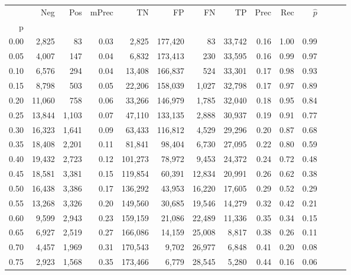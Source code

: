 \begin{tabular}{rrrrrrrrrrrrrr}
\toprule
{} &     Neg &    Pos & mPrec &       TN &       FP &      FN &      TP &  Prec &   Rec & $\hat{p}$ \\
p    &         &        &       &          &          &         &         &       &       &           \\
\midrule
0.00 &   2,825 &     83 &  0.03 &    2,825 &  177,420 &      83 &  33,742 &  0.16 &  1.00 &      0.99 \\
0.05 &   4,007 &    147 &  0.04 &    6,832 &  173,413 &     230 &  33,595 &  0.16 &  0.99 &      0.97 \\
0.10 &   6,576 &    294 &  0.04 &   13,408 &  166,837 &     524 &  33,301 &  0.17 &  0.98 &      0.93 \\
0.15 &   8,798 &    503 &  0.05 &   22,206 &  158,039 &   1,027 &  32,798 &  0.17 &  0.97 &      0.89 \\
0.20 &  11,060 &    758 &  0.06 &   33,266 &  146,979 &   1,785 &  32,040 &  0.18 &  0.95 &      0.84 \\
0.25 &  13,844 &  1,103 &  0.07 &   47,110 &  133,135 &   2,888 &  30,937 &  0.19 &  0.91 &      0.77 \\
0.30 &  16,323 &  1,641 &  0.09 &   63,433 &  116,812 &   4,529 &  29,296 &  0.20 &  0.87 &      0.68 \\
0.35 &  18,408 &  2,201 &  0.11 &   81,841 &   98,404 &   6,730 &  27,095 &  0.22 &  0.80 &      0.59 \\
0.40 &  19,432 &  2,723 &  0.12 &  101,273 &   78,972 &   9,453 &  24,372 &  0.24 &  0.72 &      0.48 \\
0.45 &  18,581 &  3,381 &  0.15 &  119,854 &   60,391 &  12,834 &  20,991 &  0.26 &  0.62 &      0.38 \\
0.50 &  16,438 &  3,386 &  0.17 &  136,292 &   43,953 &  16,220 &  17,605 &  0.29 &  0.52 &      0.29 \\
0.55 &  13,268 &  3,326 &  0.20 &  149,560 &   30,685 &  19,546 &  14,279 &  0.32 &  0.42 &      0.21 \\
0.60 &   9,599 &  2,943 &  0.23 &  159,159 &   21,086 &  22,489 &  11,336 &  0.35 &  0.34 &      0.15 \\
0.65 &   6,927 &  2,519 &  0.27 &  166,086 &   14,159 &  25,008 &   8,817 &  0.38 &  0.26 &      0.11 \\
0.70 &   4,457 &  1,969 &  0.31 &  170,543 &    9,702 &  26,977 &   6,848 &  0.41 &  0.20 &      0.08 \\
0.75 &   2,923 &  1,568 &  0.35 &  173,466 &    6,779 &  28,545 &   5,280 &  0.44 &  0.16 &      0.06 \\

\end{tabular}

